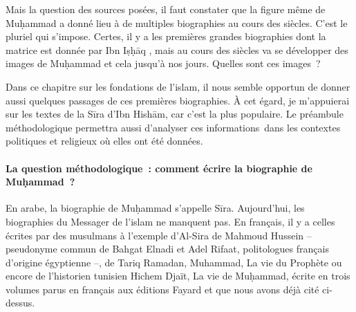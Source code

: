 Mais la question des sources posées, il faut constater que la figure
même de Muḥammad a donné lieu à de multiples biographies au cours des
siècles. C'est le pluriel qui s'impose. Certes, il y a les premières
grandes biographies dont la matrice est donnée par Ibn Iṣḥāq
, mais au cours des siècles va se développer des images de
Muḥammad et cela jusqu'à nos jours. Quelles sont ces images~?

Dans ce chapitre sur les fondations de l'islam, il nous semble opportun
de donner aussi quelques passages de ces premières biographies. À cet
égard, je m'appuierai sur les textes de la Sīra d'Ibn Hishām, car c'est
la plus populaire. Le préambule méthodologique permettra aussi
d'analyser ces informations~dans les contextes politiques et religieux
où elles ont été données.


\paragraph{{La question méthodologique~: comment écrire la biographie de Muḥammad~? }}

En arabe, la biographie de Muḥammad s'appelle Sīra. Aujourd'hui, les
biographies du Messager de l'islam ne manquent pas. En français, il y a
celles écrites par des musulmans à l'exemple d'Al-Sira de Mahmoud
Hussein -- pseudonyme commun de Bahgat Elnadi et Adel Rifaat,
politologues français d'origine égyptienne --, de Tariq Ramadan,
Muhammad, La vie du Prophète ou encore de l'historien tunisien Hichem
Djaït, La vie de Muḥammad, écrite en trois volumes parus en français aux
éditions Fayard et que nous avons déjà cité ci-dessus.

